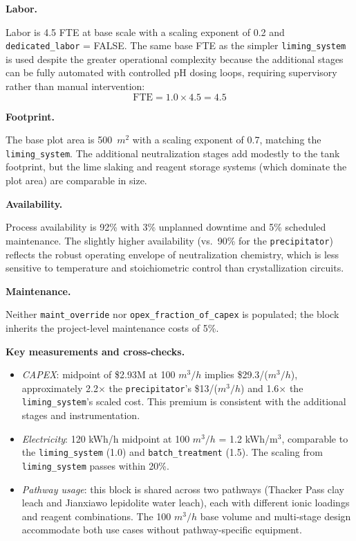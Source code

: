 \medskip
\noindent\textbf{Labor.}\quad

Labor is 4.5 FTE at base scale with a scaling exponent of 0.2 and \texttt{dedicated\_labor} = FALSE. The same base FTE as the simpler \texttt{liming\_system} is used despite the greater operational complexity because the additional stages can be fully automated with controlled pH dosing loops, requiring supervisory rather than manual intervention:
\[
	\text{FTE} = 1.0 \times 4.5 = 4.5
\]

\medskip
\noindent\textbf{Footprint.}\quad

The base plot area is 500~$\si{m^2}$ with a scaling exponent of 0.7, matching the \texttt{liming\_system}. The additional neutralization stages add modestly to the tank footprint, but the lime slaking and reagent storage systems (which dominate the plot area) are comparable in size.

\medskip
\noindent\textbf{Availability.}\quad

Process availability is 92\% with 3\% unplanned downtime and 5\% scheduled maintenance. The slightly higher availability (vs.\ 90\% for the \texttt{precipitator}) reflects the robust operating envelope of neutralization chemistry, which is less sensitive to temperature and stoichiometric control than crystallization circuits.

\medskip
\noindent\textbf{Maintenance.}\quad

Neither \texttt{maint\_override} nor \texttt{opex\_fraction\_of\_capex} is populated; the block inherits the project-level maintenance costs of 5\%. 

\medskip
\noindent\textbf{Key measurements and cross-checks.}\quad

\begin{itemize}[noitemsep]
	\item \textit{CAPEX}: midpoint of \$2.93M at 100 $\si{m^3/h}$ implies \$29.3/($\si{m^3/h}$), approximately 2.2$\times$ the \texttt{precipitator}'s \$13/($\si{m^3/h}$) and 1.6$\times$ the \texttt{liming\_system}'s scaled cost. This premium is consistent with the additional stages and instrumentation.
	\item \textit{Electricity}: 120 kWh/h midpoint at 100 $\si{m^3/h}$ = 1.2 kWh/m$^3$, comparable to the \texttt{liming\_system} (1.0) and \texttt{batch\_treatment} (1.5). The scaling from \texttt{liming\_system} passes within 20\%.
	\item \textit{Pathway usage}: this block is shared across two pathways (Thacker Pass clay leach and Jianxiawo lepidolite water leach), each with different ionic loadings and reagent combinations. The 100 $\si{m^3/h}$ base volume and multi-stage design accommodate both use cases without pathway-specific equipment.
\end{itemize}

